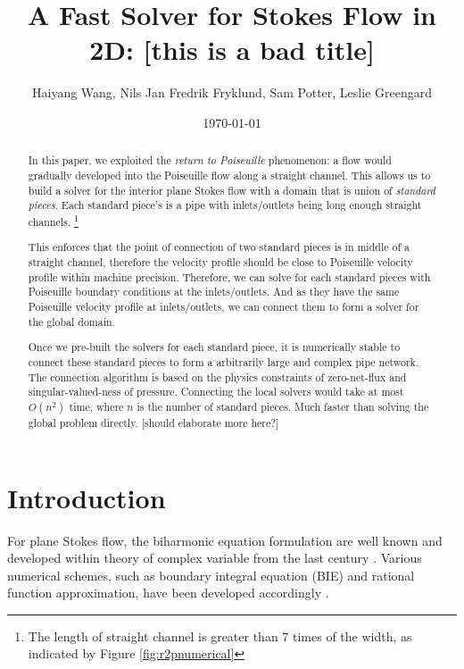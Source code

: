 \documentclass[10pt,twocolumn]{article}
\author{Haiyang Wang, Nils Jan Fredrik Fryklund, Sam Potter, Leslie Greengard}
\date{\today}
\title{A Fast Solver for Stokes Flow in 2D: [this is a bad title]}
\begin{document}
\maketitle

\begin{abstract}
  In this paper, we exploited the \textit{return to Poiseuille} phenomenon: 
  a flow would gradually developed into the Poiseuille flow along a straight channel.
  This allows us to build a solver for the interior plane Stokes flow
  with a domain that is union of \textit{standard pieces}. 
  Each standard piece's is a pipe with inlets/outlets 
  being long enough straight channels.
  \footnote{The length of straight channel is greater than 7 times of the width, as indicated by Figure \ref{fig:r2pnumerical} }

  This enforces that the point of connection of two standard pieces is in middle of a straight channel,
  therefore the velocity profile should be close to Poiseuille velocity profile within machine precision. 
  Therefore, we can solve for each standard pieces with Poiseuille boundary conditions at the inlets/outlets.
  And as they have the same Poiseuille velocity profile at inlets/outlets, we can connect them to form a 
  solver for the global domain. 

  Once we pre-built the solvers for each standard piece, 
  it is numerically stable to connect these standard pieces to form 
  a arbitrarily large and complex pipe network. 
  The connection algorithm is based on 
  the physics constraints of  zero-net-flux and singular-valued-ness of pressure. 
  Connecting the local solvers would take at most $O(n^2)$ time, 
  where $n$ is the number of standard pieces. 
  Much faster than solving the global problem directly. [should elaborate more here?]
\end{abstract}

\section{Introduction}

For plane Stokes flow, the biharmonic equation formulation are well known 
and developed within theory of complex variable from the last century \cite{ladyzhenskayaMathematicalTheoryViscous1964}. 
Various numerical schemes, such as boundary integral equation (BIE) and rational function approximation, 
have been developed accordingly \cite{greengardIntegralEquationMethods1996,trefethenApproximationTheoryApproximation2019}. 
\end{document}
